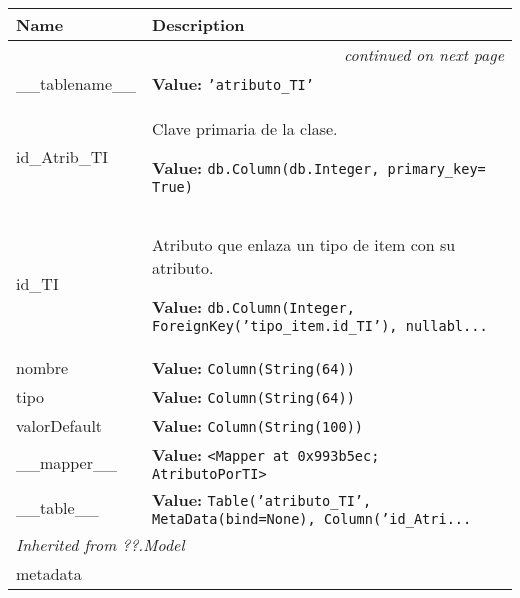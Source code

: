    \vspace{-1cm}
\hspace{\varindent}\begin{longtable}{|p{\varnamewidth}|p{\vardescrwidth}|l}
\cline{1-2}
\cline{1-2} \centering \textbf{Name} & \centering \textbf{Description}& \\
\cline{1-2}
\endhead\cline{1-2}\multicolumn{3}{r}{\small\textit{continued on next page}}\\\endfoot\cline{1-2}
\endlastfoot\raggedright \_\-\_\-t\-a\-b\-l\-e\-n\-a\-m\-e\-\_\-\_\- & \raggedright \textbf{Value:} 
{\tt \texttt{'}\texttt{atributo\_TI}\texttt{'}}&\\
\cline{1-2}
\raggedright i\-d\-\_\-A\-t\-r\-i\-b\-\_\-T\-I\- & \raggedright Clave primaria de la clase.

\textbf{Value:} 
{\tt db.Column(db.Integer, primary\_key= True)}&\\
\cline{1-2}
\raggedright i\-d\-\_\-T\-I\- & \raggedright Atributo que enlaza un tipo de item con su atributo.

\textbf{Value:} 
{\tt db.Column(Integer, ForeignKey('tipo\_item.id\_TI'), nullabl\texttt{...}}&\\
\cline{1-2}
\raggedright n\-o\-m\-b\-r\-e\- & \raggedright \textbf{Value:} 
{\tt Column(String(64))}&\\
\cline{1-2}
\raggedright t\-i\-p\-o\- & \raggedright \textbf{Value:} 
{\tt Column(String(64))}&\\
\cline{1-2}
\raggedright v\-a\-l\-o\-r\-D\-e\-f\-a\-u\-l\-t\- & \raggedright \textbf{Value:} 
{\tt Column(String(100))}&\\
\cline{1-2}
\raggedright \_\-\_\-m\-a\-p\-p\-e\-r\-\_\-\_\- & \raggedright \textbf{Value:} 
{\tt {\textless}Mapper at 0x993b5ec; AtributoPorTI{\textgreater}}&\\
\cline{1-2}
\raggedright \_\-\_\-t\-a\-b\-l\-e\-\_\-\_\- & \raggedright \textbf{Value:} 
{\tt Table('atributo\_TI', MetaData(bind=None), Column('id\_Atri\texttt{...}}&\\
\cline{1-2}
\multicolumn{2}{|l|}{\textit{Inherited from ??.Model}}\\
\multicolumn{2}{|p{\varwidth}|}{\raggedright metadata}\\
\cline{1-2}
\end{longtable}



